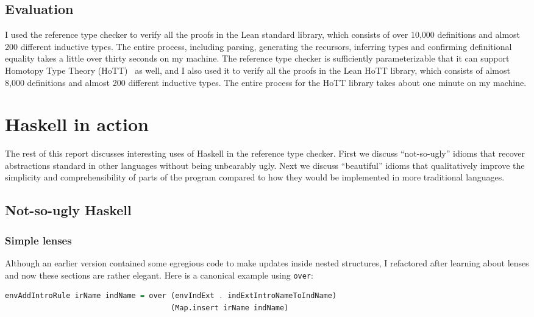 \documentclass{article}
\begin{document}
\begin{spacing}{1.1}
\subsection{Evaluation}

I used the reference type checker to verify all the proofs in the Lean standard library, which consists of over 10,000 definitions and almost 200 different inductive types. The entire process, including parsing, generating the recursors, inferring types and confirming definitional equality takes a little over thirty seconds on my machine. The reference type checker is sufficiently parameterizable that it can support Homotopy Type Theory (HoTT)~\cite{awodey2015homotopy} as well, and I also used it to verify all the proofs in the Lean HoTT library, which consists of almost 8,000 definitions and almost 200 different inductive types. The entire process for the HoTT library takes about one minute on my machine.

\section{Haskell in action}

The rest of this report discusses interesting uses of Haskell in the reference type checker. First we discuss ``not-so-ugly'' idioms that recover abstractions standard in other languages without being unbearably ugly. Next we discuss ``beautiful'' idioms that qualitatively improve the simplicity and comprehensibility of parts of the program compared to how they would be implemented in more traditional languages.

\subsection{Not-so-ugly Haskell}

\subsubsection{Simple lenses}

Although an earlier version contained some egregious code to make updates inside nested structures, I refactored after learning about lenses and now these sections are rather elegant. Here is a canonical example using \lstinline{over}:
\begin{lstlisting}[language=Haskell]
envAddIntroRule irName indName = over (envIndExt . indExtIntroNameToIndName)
                                      (Map.insert irName indName)
\end{lstlisting}


\end{spacing}
\end{document}
